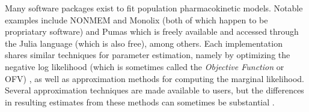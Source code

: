 Many software packages exist to fit population pharmacokinetic models.  Notable examples  include NONMEM \cite{bauer2011nonmem} and Monolix \cite{noauthor_monolix_nodate} (both of which happen to be propriatary software) and Pumas \cite{rackauckas2020accelerated} which is freely available and accessed through the Julia language (which is also free), among others.  Each implementation shares similar techniques for parameter estimation, namely by optimizing the negative log likelihood (which is sometimes called the \textit{Objective Function} or OFV) \cite{bauer2011nonmem, mould2013basic, bauer_nonmem_2019}, as well as approximation methods for computing the marginal likelihood.  Several approximation techniques are made available to users, but the differences in resulting estimates from these methods can sometimes be substantial \cite{mould2013basic}.